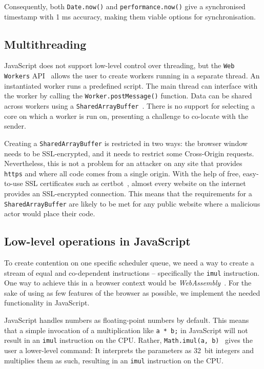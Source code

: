 \documentclass[11pt,
  titlepage=false,
  parskip=half,      %
]{scrreprt}
\begin{document}
Consequently, both \texttt{Date.now()} and \texttt{performance.now()} give a synchronised timestamp with 1 ms accuracy, making them viable options for synchronisation.

\subsection{Multithreading}\label{subsec:multithreading}
JavaScript does not support low-level control over threading, but the \texttt{Web Workers} API~\cite{webworkers} allows the user to create workers running in a separate thread.
An instantiated worker runs a predefined script.
The main thread can interface with the worker by calling the \texttt{Worker.postMessage()} function.
Data can be shared across workers using a \texttt{SharedArrayBuffer}~\cite{sharedarraybuffer}.
There is no support for selecting a core on which a worker is run on, presenting a challenge to co-locate with the sender.

Creating a \texttt{SharedArrayBuffer} is restricted in two ways: the browser window needs to be SSL-encrypted, and it needs to restrict some Cross-Origin requests.
Nevertheless, this is not a problem for an attacker on any site that provides \texttt{https} and where all code comes from a single origin.
With the help of free, easy-to-use SSL certificates such as certbot~\cite{certbot}, almost every website on the internet provides an SSL-encrypted connection.
This means that the requirements for a \texttt{SharedArrayBuffer} are likely to be met for any public website where a malicious actor would place their code.

\subsection{Low-level operations in JavaScript}\label{subsec:lowleveljs}
To create contention on one specific scheduler queue, we need a way to create a stream of equal and co-dependent instructions -- specifically the \texttt{imul} instruction.
One way to achieve this in a browser context would be \textit{WebAssembly}~\cite{webassembly}.
For the sake of using as few features of the browser as possible, we implement the needed functionality in JavaScript.

JavaScript handles numbers as floating-point numbers by default.
This means that a simple invocation of a multiplication like \texttt{a * b;} in JavaScript will not result in an \texttt{imul} instruction on the CPU.
Rather, \texttt{Math.imul(a, b)}~\cite{mathimul} gives the user a lower-level command:
It interprets the parameters as 32~bit integers and multiplies them as such, resulting in an \texttt{imul} instruction on the CPU.
\end{document}
